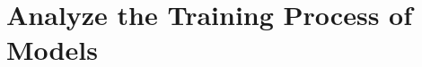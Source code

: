 \newpage

\section{Analyze the Training Process of Models}




% 
% 
% 
% 
% 
% 
% 
% 
% 
% 
% 

% 

\newpage
